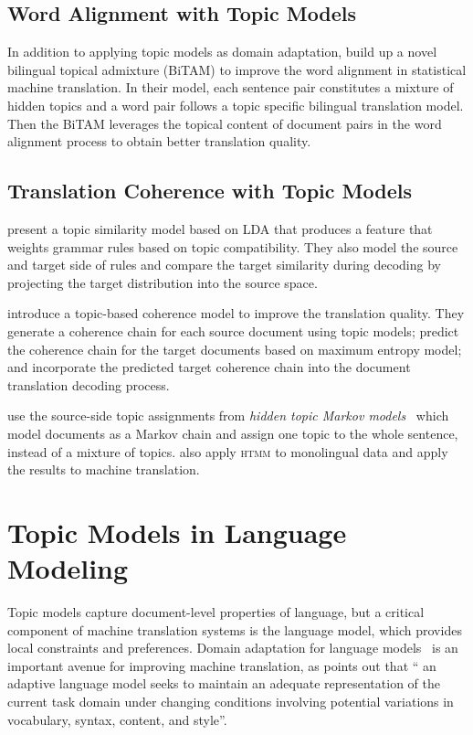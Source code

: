 \subsection{Word Alignment with Topic Models}

In addition to applying topic models as domain adaptation, \citet{zhao-06} build up a novel bilingual topical admixture (BiTAM) to improve the word alignment in statistical machine translation. In their model, each sentence pair constitutes a mixture of hidden topics and a word pair follows a topic specific bilingual translation model. Then the BiTAM leverages the topical content of document pairs in the word alignment process to obtain better translation quality.

\subsection{Translation Coherence with Topic Models}

\citet{xiao-12} present a topic similarity model based on LDA that produces a feature that weights grammar rules based on topic compatibility. They also model the source and target side of rules and compare the target similarity during decoding by projecting the target distribution into the source space.

\citet{xiong-13} introduce a topic-based coherence model to improve the translation quality. They generate a coherence chain for each source document using topic models; predict the coherence chain for the target documents based on maximum entropy model; and incorporate the predicted target coherence chain into the document translation decoding process.

\citet{hasler-12} use the source-side topic assignments from \emph{hidden topic Markov models}~\citep[\textsc{htmm}]{gruber-07} which model documents as a Markov chain and assign one topic to the whole sentence, instead of a mixture of topics.  \citet{su-12} also apply \textsc{htmm} to monolingual data and apply the results to machine translation.

\section{Topic Models in Language Modeling}

Topic models capture document-level properties of language, but a critical component of machine translation systems is the language model, which provides local constraints and preferences. Domain adaptation for language models~\citep{Bellegarda-04,wood-09} is an important avenue for improving machine translation, as \citet{Bellegarda-04} points out that `` an adaptive language
model seeks to maintain an adequate representation of the current task domain under changing conditions involving
potential variations in vocabulary, syntax, content, and style''.

